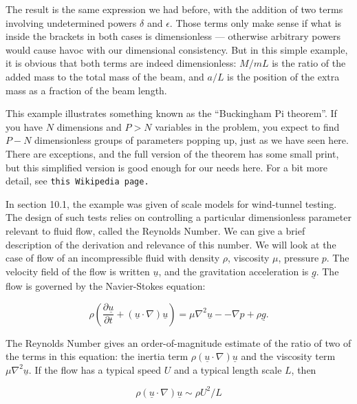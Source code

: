   The result is the same expression we had before, with the addition of two 
  terms involving undetermined powers $\delta$ and $\epsilon$. Those terms only 
  make sense if what is inside the brackets in both cases is dimensionless --- 
  otherwise arbitrary powers would cause havoc with our dimensional 
  consistency. But in this simple example, it is obvious that both terms are 
  indeed dimensionless: $M/mL$ is the ratio of the added mass to the total mass 
  of the beam, and $a/L$ is the position of the extra mass as a fraction of the 
  beam length. 

  This example illustrates something known as the ``Buckingham Pi theorem''. If 
  you have $N$ dimensions and $P > N$ variables in the problem, you expect to 
  find $P-N$ dimensionless groups of parameters popping up, just as we have 
  seen here. There are exceptions, and the full version of the theorem has some 
  small print, but this simplified version is good enough for our needs here. 
  For a bit more detail, see \tt{}this Wikipedia page\rm{}. 

  In section 10.1, the example was given of scale models for wind-tunnel 
  testing. The design of such tests relies on controlling a particular 
  dimensionless parameter relevant to fluid flow, called the Reynolds Number. 
  We can give a brief description of the derivation and relevance of this 
  number. We will look at the case of flow of an incompressible fluid with 
  density $\rho$, viscosity $\mu$, pressure $p$. The velocity field of the flow 
  is written $\underline{u}$, and the gravitation acceleration is 
  $\underline{g}$. The flow is governed by the Navier-Stokes equation: 

  \begin{equation*}\rho \left(\dfrac{\partial \underline{u}}{\partial t} + 
  (\underline{u} \cdot \nabla) \underline{u} \right) = \mu \nabla^2 
  \underline{u} -- \nabla p + \rho \underline{g} . \tag{17}\end{equation*} 

  The Reynolds Number gives an order-of-magnitude estimate of the ratio of two 
  of the terms in this equation: the inertia term $\rho (\underline{u} \cdot 
  \nabla) \underline{u}$ and the viscosity term $\mu \nabla^2 \underline{u}$. 
  If the flow has a typical speed $U$ and a typical length scale $L$, then 

  \begin{equation*}\rho (\underline{u} \cdot \nabla) \underline{u} \sim \rho 
  U^2 / L \tag{18}\end{equation*} 

